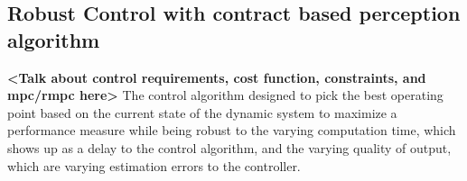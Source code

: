 \subsection{Robust Control with contract based perception algorithm}

\textbf{<Talk about control requirements, cost function, constraints, and mpc/rmpc here>}
The control algorithm designed to pick the best operating point based on the current state of the dynamic system to maximize a performance measure while being robust to the varying computation time, which shows up as a delay to the control algorithm, and the varying quality of output, which are varying estimation errors to the controller.






